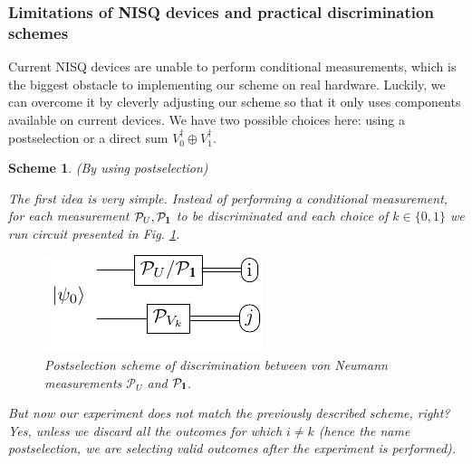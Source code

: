 \documentclass[preprint,12pt, a4paper]{elsarticle}
\newcommand{\1}{{\rm 1\hspace{-0.9mm}l}}
\newcommand{\Id}{{\rm 1\hspace{-0.9mm}l}}
\newcommand{\PP}{\mathcal{P}}
\newtheorem{scheme}{Scheme}
\begin{document}
\subsubsection{Limitations of NISQ devices and practical discrimination schemes}

Current NISQ devices are unable to perform conditional measurements, which is the biggest
obstacle to implementing our scheme on real hardware. Luckily, we can overcome it by
cleverly adjusting our scheme so that it only uses components available on current devices.
We have two possible choices here: using a postselection or a direct sum
$V_0^\dagger\oplus V_1^\dagger$.

\begin{scheme}(By using postselection)

The first idea is very simple. Instead of performing a conditional measurement, for each
measurement $\PP_U, \PP_\Id$ to be discriminated and each choice of $k \in \{0, 1\}$ we run circuit presented in Fig. \ref{fig:postselection}.

\begin{figure}[h!]
	\centering
	\includegraphics[scale=1.7]{pics/postselection_no_channels}

	\caption{
		Postselection scheme of discrimination between von Neumann measurements $\PP_{U}$ and $\PP_\Id$.
	}\label{fig:postselection}
\end{figure}

But now our experiment does not match the previously described scheme, right?
Yes, unless we discard all the outcomes for which $i\ne k$ (hence the name \emph{postselection},
we are selecting valid outcomes after the experiment is performed).




\end{scheme}
\end{document}
